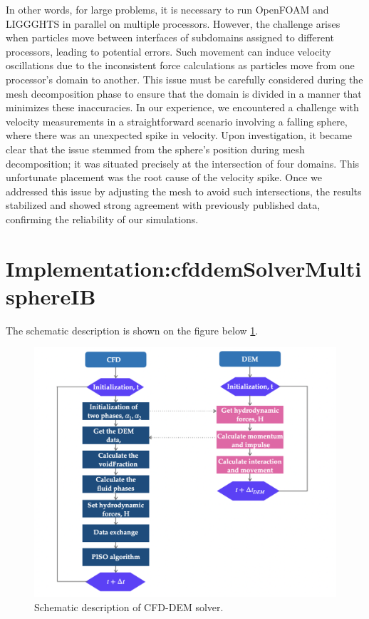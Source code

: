 In other words, for large problems, it is necessary to run OpenFOAM and LIGGGHTS in parallel on multiple processors. However, the challenge arises when particles move between interfaces of subdomains assigned to different processors, leading to potential errors. Such movement can induce velocity oscillations due to the inconsistent force calculations as particles move from one processor's domain to another. This issue must be carefully considered during the mesh decomposition phase to ensure that the domain is divided in a manner that minimizes these inaccuracies. In our experience, we encountered a challenge with velocity measurements in a straightforward scenario involving a falling sphere, where there was an unexpected spike in velocity. Upon investigation, it became clear that the issue stemmed from the sphere's position during mesh decomposition; it was situated precisely at the intersection of four domains. This unfortunate placement was the root cause of the velocity spike. Once we addressed this issue by adjusting the mesh to avoid such intersections, the results stabilized and showed strong agreement with previously published data, confirming the reliability of our simulations.

\section{Implementation:cfddemSolverMultisphereIB}
The schematic description is shown on the figure below \ref{fig:cfddemSolver}. 
\begin{figure}[!ht]
    \centering
    \includegraphics[width=16cm]{Images/chap4/CFD-DEM_scheme.png}
    \caption{Schematic description of CFD-DEM solver.}
    \label{fig:cfddemSolver}
\end{figure}


